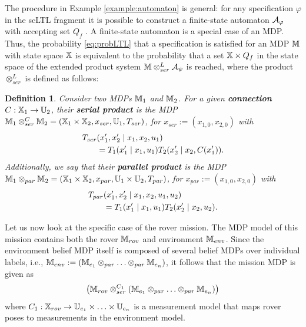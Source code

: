 \documentclass[conference]{IEEEtran}
\renewcommand{\cite}[1]{\citep{#1}}
\newtheorem{definition}{Definition}
\begin{document}
The procedure in Example \ref{example:automaton} is general: for any specification $\varphi$ in the scLTL fragment it is possible to construct a finite-state automaton $\mathcal{A}_\varphi$ with accepting set $Q_f$ \cite{Belta2017}. A finite-state automaton is a special case of an MDP. Thus, the probability \eqref{eq:probLTL} that a specification is satisfied for an MDP $\mathbb{M}$ with state space $\mathbb{X}$ is equivalent to the probability that a set $\mathbb{X}\times Q_f$ in the state space of the extended product system $\mathbb{M} \otimes_{ser}^L \mathcal{A}_\psi$ is reached, where the product $\otimes_{ser}^L$ is defined as follows:
\begin{definition} Consider two MDPs  $\mathbb{M}_1$ and $\mathbb{M}_2$. For a given \textbf{connection} $C : \mathbb{X}_1 \rightarrow \mathbb{U}_2$, their \textbf{serial product} is the MDP $\mathbb{M}_1 \otimes_{ser}^C \mathbb{M}_2 = (\mathbb{X}_1 \times \mathbb{X}_2, x_{ser}, \mathbb{U}_1, T_{ser})$, for $x_{ser}:= (x_{1,0},x_{2,0})$
  with %
  \begin{equation}\label{eq:serial}
  \begin{aligned}
      \tr_{ser}&(x_1', x_2' \mid x_1, x_2, u_1) \\
      & = \tr_1 (x_1' \mid x_1, u_1) \tr_2 (x_2' \mid x_2, C(x_1') ).
  \end{aligned}
  \end{equation}
  Additionally, we say that their  \textbf{parallel product} is the MDP $\mathbb{M}_1 \otimes_{par} \mathbb{M}_2 = (\mathbb{X}_1 \times \mathbb{X}_2, x_{par}, \mathbb{U}_1 \times \mathbb{U}_2, T_{par})$,  for $x_{par}:= (x_{1,0},x_{2,0})$ with
  \begin{equation}
  \begin{aligned}
      T_{par}&(x_1', x_2' \mid x_1, x_2, u_1, u_2) \\
      & = T_1 (x_1' \mid x_1, u_1) T_2 (x_2' \mid x_2, u_2).
  \end{aligned}
  \end{equation}
\end{definition}

 Let us now look at the specific case of the rover mission. The MDP model of this mission contains both the rover $\mathbb{M}_{rov}$ and environment $\mathbb{M}_{env}$.
Since   the environment belief MDP itself is composed of several belief MDPs over individual labels, i.e., $\mathbb{M}_{env}:=\left( \mathbb{M}_{e_1} \otimes_{par} \ldots \otimes_{par} \mathbb{M}_{e_n} \right) $, it follows that the mission MDP is given as
\begin{equation}
  \left( \mathbb{M}_{rov} \otimes_{ser}^{C_1}\left( \mathbb{M}_{e_1} \otimes_{par} \ldots \otimes_{par} \mathbb{M}_{e_n} \right) \right)
\end{equation}
where $C_1 : \mathbb{X}_{rov} \rightarrow \mathbb{U}_{e_1} \times \ldots \times \mathbb{U}_{e_n}$ is a measurement model that maps rover poses to measurements in the environment model.
\end{document}
